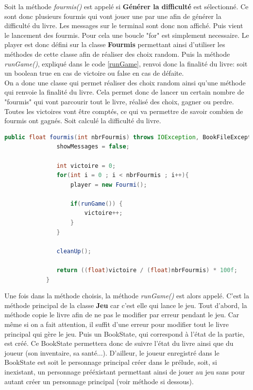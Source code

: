 		Soit la méthode \textit{fourmis()} est appelé si \textbf{Générer la difficulté} est sélectionné. Ce sont donc plusieurs fourmis qui vont jouer une par une afin de générer la difficulté du livre. Les messages sur le terminal sont donc non affiché. Puis vient le lancement des fourmis. Pour cela une boucle "for" est simplement necessaire. Le player est donc défini sur la classe \textbf{Fourmis} permettant ainsi d'utiliser les méthodes de cette classe afin de réaliser des choix random. Puis la méthode \textit{runGame()}, expliqué dans le code \ref{runGame}, renvoi donc la finalité du livre: soit un boolean true en cas de victoire ou false en cas de défaite.\\
		On a donc une classe qui permet réaliser des choix random ainsi qu'une méthode qui renvoie la finalité du livre. Cela permet donc de lancer un certain nombre de "fourmis" qui vont parcourir tout le livre, réalisé des choix, gagner ou perdre. Toutes les victoires vont être comptés, ce qui va permettre de savoir combien de fourmis ont gagnés. Soit calculé la difficulté du livre.

		\begin{lstlisting}[language=java, caption=fourmis()]
			public float fourmis(int nbrFourmis) throws IOException, BookFileException {
			   showMessages = false;

			   int victoire = 0;
			   for(int i = 0 ; i < nbrFourmis ; i++){
				   player = new Fourmi();

				   if(runGame()) {
					   victoire++;
				   }
			   }

			   cleanUp();

			   return ((float)victoire / (float)nbrFourmis) * 100f;
			}
		\end{lstlisting}


		Une fois dans la méthode choisis, la méthode \textit{runGame()} est alors appelé. C'est la méthode principal de la classe \textbf{Jeu} car c'est elle qui lance le jeu.
		Tout d'abord, la méthode copie le livre afin de ne pas le modifier par erreur pendant le jeu. Car même si on a fait attention, il suffit d'une erreur pour modifier tout le livre principal qui gère le jeu. Puis un BookState, qui correspond à l'état de la partie, est créé. Ce BookState permettera donc de suivre l'état du livre ainsi que du joueur (son inventaire, sa santé...). D'ailleur, le joueur enregistré dans le BookState est soit le personnage principal créer dans le prélude, soit, si inexistant, un personnage prééxistant permettant ainsi de jouer au jeu sans pour autant créer un personnage principal (voir méthode si dessous).


